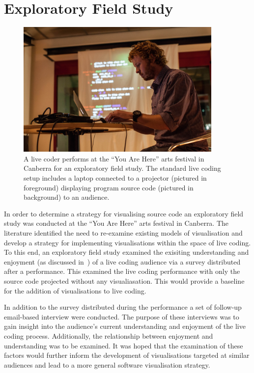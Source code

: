 
\chapter{Exploratory Field Study}
\label{chap:exploratory-field-study}

\begin{figure}
\centering
\includegraphics[width=0.9\textwidth]{../images/study-1-you-are-here-ben.jpg}
\caption{A live coder performs at the ``You Are Here'' arts festival in Canberra for an exploratory field study. The standard live coding setup includes a laptop connected to a projector (pictured in foreground) displaying program source code (pictured in background) to an audience.}
\label{fig:exploratory-field-study-ben}
\end{figure}


In order to determine a strategy for visualising source code an exploratory field study was conducted at the ``You Are Here'' arts festival in Canberra. The literature identified the need to re-examine existing models of visualisation and develop a strategy for implementing visualisations within the space of live coding. To this end, an exploratory field study examined the exisiting understanding and enjoyment (as discussed in~\cite{McLean2010a}) of a live coding audience via a survey distributed after a performance. This examined the live coding performance with only the source code projected without any visualiasation. This would provide a baseline for the addition of visualisations to live coding.

In addition to the survey distributed during the performance a set of follow-up email-based interview were conducted. The purpose of these interviews was to gain insight into the audience's current understanding and enjoyment of the live coding process. Additionally, the relationship between enjoyment and understanding was to be examined. It was hoped that the examination of these factors would further inform the development of visualisations targeted at similar audiences and lead to a more general software visualisation strategy.

